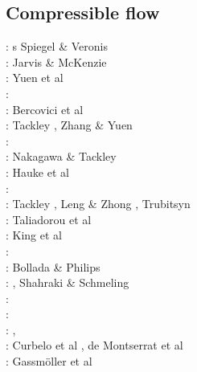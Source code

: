 \subsection{Compressible flow}

\begin{scriptsize}
\nineteensixty: s Spiegel \& Veronis \cite{spve60}\\
\nineteeneighty: Jarvis \& McKenzie \cite{jamc80}\\
\nineteeneightyseven:  Yuen et al \cite{yuqh87}\\
\nineteeneightyeight: \cite{glat88}\\
\nineteenninetytwo: Bercovici et al \cite{besg92}\\
\nineteenninetysix: Tackley \cite{tack96}, Zhang \& Yuen \cite{zhyu96}\\
\nineteenninetyeight: \cite{mite98} \\
\twothousandfour: Nakagawa \& Tackley \cite{nata04}\\
\twothousandfive: Hauke et al \cite{halg05a,halg05b}\\
\twothousandseven: \cite{feku07} \\
\twothousandeight: Tackley \cite{tack08}, Leng \& Zhong \cite{lezh08}, Trubitsyn \cite{trub08}\\
\twothousandnine: Taliadorou et al \cite{tagm09} \\
\twothousandten: King et al \cite{kilv10}\\
\twothousandeleven: \cite{talz11}\\
\twothousandtwelve: Bollada \& Philips \cite{boph12}\\
\twothousandthirteen: \cite{lizh13}, Shahraki \& Schmeling \cite{shsc13}\\
\twothousandfifteen: \cite{kamo15}\\
\twothousandsixteen: \cite{ghbu16}\\
\twothousandeighteen: \cite{cogb18}, \cite{ghbu18}\\
\twothousandnineteen: Curbelo et al \cite{cuda19}, de Montserrat et al \cite{demh19}\\
\twothousandtwenty: Gassm{\"o}ller et al \cite{gadb20}
\end{scriptsize}

